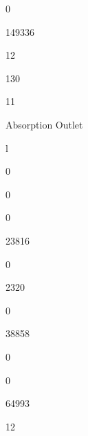 \documentclass[a4paper,portrait,12pt]{article}
\begin{document}
0





149336





12





130





11





\begin{flushleft}
Absorption Outlet
\end{flushleft}





\begin{flushleft}
l
\end{flushleft}





0





0





0





23816





0





2320





0





38858





0





0





64993





12
\end{document}
